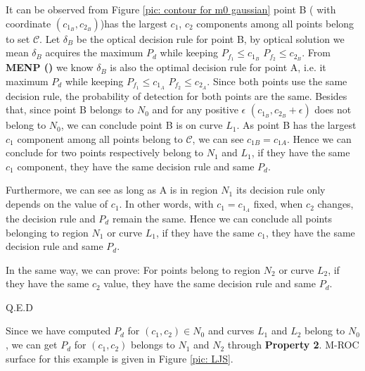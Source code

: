 It can be observed from Figure \ref{pic: contour for m0 gaussian} point B ( with coordinate $(c_{1_B}, c_{2_B})$)has the largest $c_1$, $c_2$ components among all points belong to set $\mathcal{C}$. 
Let $\delta_B$ be the optical decision rule for point B, by optical solution we mean $\delta_B$ acquires the maximum $P_d$ while keeping $P_{f_1} \leq c_{1_B}$ $P_{f_2} \leq c_{2_B}$.
From \textbf{MENP ()} we know  $\delta_B$ is also the optimal decision rule for point A, i.e. it maximum $P_d$ while keeping $P_{f_1} \leq c_{1_A}$ $P_{f_2} \leq c_{2_A}$. Since both points use the same decision rule, the probability of detection for both points are the same. Besides that, since point B belongs to $N_0$ and for any positive $\epsilon$ $(c_{1_B}, c_{2_B} + \epsilon)$ does not belong to $N_0$, we can conclude point B is on curve $L_1$. As point B has the largest $c_1$ component among all points belong to $\mathcal{C}$, we can see $c_{1B} = c_{1A}$. Hence we can conclude for two points respectively belong to $N_1$ and $L_1$, if they have the same $c_1$ component, they have the same decision rule and same $P_d$. 

Furthermore, we can see as long as A is in region $N_1$ its decision rule only depends on the value of $c_{1}$.  In other words, with $c_1 = c_{1_A}$ fixed,  when $c_{2}$ changes, the decision rule and $P_d$ remain the same. Hence we can conclude all points belonging to region $N_1$ or curve $L_1$, if they have the same $c_1$, they have the same decision rule and same $P_d$.

In the same way, we can prove: For points belong to region $N_2$ or curve $L_2$, if they have the same $c_2$ value, they have the same decision rule and same $P_d$.

Q.E.D

Since we have computed $P_d$ for $(c_1, c_2) \in N_0$ and curves $L_1$ and $L_2$ belong to $N_0$, we can get $P_d$ for $(c_1, c_2)$ belongs to $N_1$ and $N_2$ through \textbf{Property 2}. M-ROC surface for this example is given in Figure  \ref{pic: LJS}.

